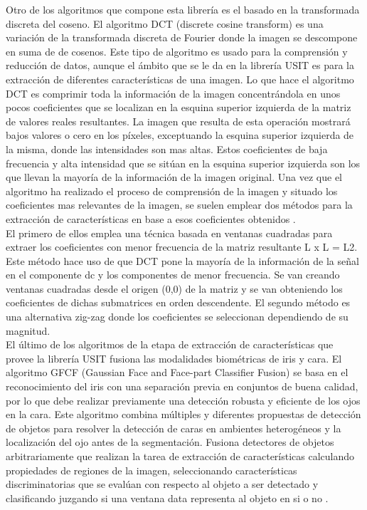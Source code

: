 Otro de los algoritmos que compone esta librería es el basado en la transformada  discreta del coseno. El algoritmo DCT (discrete cosine transform) es una variación de la transformada discreta de Fourier donde la imagen se descompone en suma de de cosenos. Este tipo de algoritmo es usado para la comprensión y reducción de datos, aunque el ámbito que se le da en la librería USIT es para la extracción de diferentes características de una imagen. Lo que hace el algoritmo DCT es comprimir toda la información de la imagen concentrándola en unos pocos coeficientes que se localizan en la esquina superior izquierda de la matriz de valores reales resultantes. La imagen que resulta de esta operación mostrará bajos valores o cero en los píxeles, exceptuando la esquina superior izquierda de la misma, donde las intensidades son mas altas. Estos coeficientes de baja frecuencia y alta intensidad que se sitúan en la esquina superior izquierda son los que llevan la mayoría de la información de la imagen original. Una vez que el algoritmo ha realizado el proceso de comprensión de la imagen y situado los coeficientes mas relevantes de la imagen, se suelen emplear dos métodos para la extracción de características en base a esos coeficientes obtenidos \cite{Reference18} \cite{Reference19}. \\

El primero de ellos emplea una técnica basada en ventanas cuadradas para extraer los coeficientes con menor frecuencia de la matriz resultante L x L = L2. Este método hace uso de que DCT pone la mayoría de la información de la señal en el componente dc y los componentes de menor frecuencia. Se van creando ventanas cuadradas desde el origen (0,0) de la matriz y se van obteniendo los coeficientes de dichas submatrices en orden descendente. El segundo método es una alternativa zig-zag donde los coeficientes se seleccionan dependiendo de su magnitud.\\

El último de los algoritmos de la etapa de extracción de características que provee la librería USIT fusiona las modalidades biométricas de iris y cara.  El algoritmo GFCF (Gaussian Face and Face-part Classifier Fusion) se basa en el reconocimiento del iris con una separación previa en conjuntos de buena calidad, por lo que debe realizar previamente una detección robusta y eficiente de los ojos en la cara. Este algoritmo combina múltiples y diferentes propuestas de detección de objetos para resolver la detección de caras en ambientes heterogéneos y la localización del ojo antes de la segmentación. Fusiona detectores de objetos arbitrariamente que realizan la tarea de extracción de características calculando propiedades de regiones de la imagen, seleccionando características discriminatorias que se evalúan con respecto al objeto a ser detectado y clasificando juzgando si una ventana data representa al objeto en si o no \cite{Reference18} \cite{Reference19}. \\



